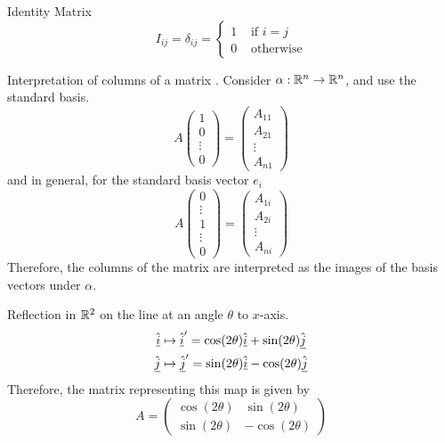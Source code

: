 \documentclass{article}
\numberwithin{equation}{section}
\begin{document}
\begin{enumdescript}
    \item[Identity Matrix]
    \[
        I_{ij} = \delta_{ij} = \begin{cases}
            1 & \text{ if } i = j \\
            0 & \text{ otherwise}
        \end{cases}
    \]

    \item[Interpretation of columns of a matrix]. Consider $\alpha: \mathbb{R}^n \rightarrow \mathbb{R}^n$, and use the standard basis.
    \[
        A \begin{pmatrix}
            1 \\ 0 \\ \vdots \\ 0
        \end{pmatrix} 
        =
        \begin{pmatrix}
            A_{11} \\ A_{21} \\ \vdots \\ A_{n1}
        \end{pmatrix}
    \]
    and in general, for the standard basis vector $e_i$
    \[
        A \begin{pmatrix}
            0 \\ \vdots \\ 1 \\ \vdots \\ 0
        \end{pmatrix} 
        =
        \begin{pmatrix}
            A_{1i} \\ A_{2i} \\ \vdots \\ A_{ni}
        \end{pmatrix}
    \]
    Therefore, the columns of the matrix are interpreted as the images of the basis vectors under $\alpha$.
    \begin{eg}
        Reflection in $\mathbb{R}^2$ on the line at an angle $\theta$ to $x$-axis.
        \begin{align*}
            \hat{\underline{i}} &\mapsto \hat{\underline{i}}' = \cos(2 \theta)\hat{\underline{i}} + \sin(2 \theta)\hat{\underline{j}} \\
            \hat{\underline{j}} &\mapsto \hat{\underline{j}}' = \sin(2 \theta)\hat{\underline{i}} - \cos(2 \theta)\hat{\underline{j}}
        \end{align*}
        Therefore, the matrix representing this map is given by
        \[
            A = \begin{pmatrix}
                \cos(2 \theta) & \sin(2 \theta) \\
                \sin(2 \theta) & -\cos(2 \theta)
            \end{pmatrix}  
        \]
    \end{eg}
\end{enumdescript}
\end{document}
